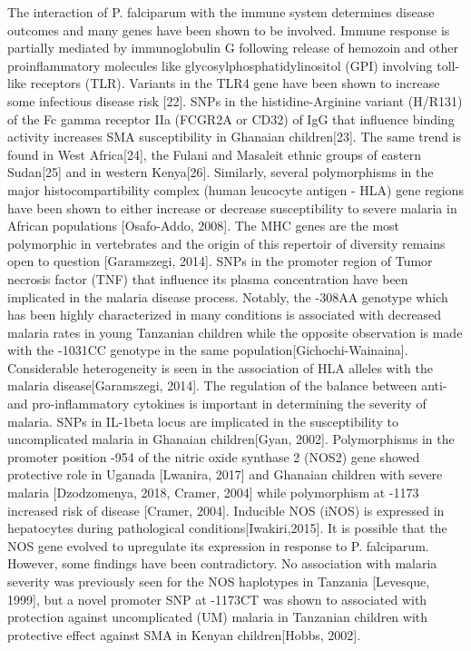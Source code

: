 \documentclass[a4paper,12pts]{report}
\begin{document}
The interaction of P. falciparum with the immune system determines disease outcomes and many genes have been shown to be involved. Immune response is partially mediated by immunoglobulin G following release of hemozoin and other proinflammatory molecules like glycosylphosphatidylinositol (GPI) involving toll-like receptors (TLR). Variants in the TLR4 gene have been shown to increase some infectious disease risk [22]. SNPs in the histidine-Arginine variant (H/R131) of the Fc gamma receptor IIa (FCGR2A or CD32) of  IgG that influence binding activity increases SMA susceptibility in Ghanaian children[23]. The same trend is found in West Africa[24], the Fulani and Masaleit ethnic groups of eastern Sudan[25] and in western Kenya[26]. Similarly, several polymorphisms in the major histocompartibility complex (human leucocyte antigen - HLA) gene regions have been shown to either increase or decrease susceptibility to severe malaria in African populations [Osafo-Addo, 2008]. The MHC genes are the most polymorphic in vertebrates and the origin of this repertoir of diversity remains open to question [Garamszegi, 2014]. SNPs in the promoter region of Tumor necrosis factor (TNF) that influence its plasma concentration have been implicated in the malaria disease process. Notably, the -308AA genotype which has been highly characterized in many conditions is associated with decreased malaria rates in young Tanzanian children while the opposite observation is made with the -1031CC genotype in the same population[Gichochi-Wainaina]. Considerable heterogeneity is seen in the association of HLA alleles with the malaria disease[Garamszegi, 2014]. The regulation of the balance between anti- and pro-inflammatory cytokines is important in determining the severity of malaria. SNPs in IL-1beta locus are implicated in the susceptibility to uncomplicated malaria in Ghanaian children[Gyan, 2002]. Polymorphisms in the promoter position -954 of the nitric oxide synthase 2 (NOS2) gene showed protective role in Uganada [Lwanira, 2017] and Ghanaian children with severe malaria [Dzodzomenya, 2018, Cramer, 2004] while polymorphism at -1173 increased risk of disease [Cramer, 2004]. Inducible NOS (iNOS) is expressed in hepatocytes during pathological conditions[Iwakiri,2015]. It is possible that the NOS gene evolved to upregulate its expression in response to P. falciparum. However, some findings have been contradictory. No association with malaria severity was previously seen for the NOS haplotypes in Tanzania [Levesque, 1999], but a novel promoter SNP at -1173CT was shown to associated with protection against uncomplicated (UM) malaria in Tanzanian children with protective effect against SMA in Kenyan children[Hobbs, 2002].
\end{document}
